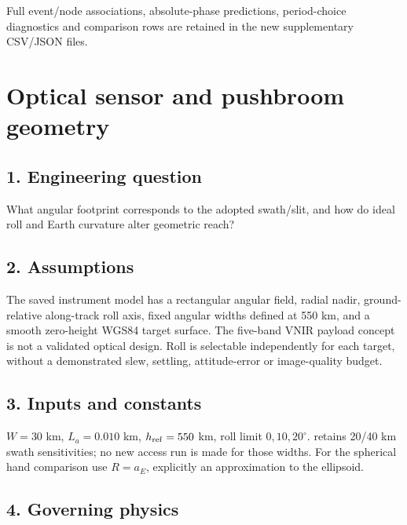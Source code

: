 \documentclass[10pt,a4paper]{article}
\numberwithin{equation}{section}
\begin{document}
\begin{sloppypar}Full event/node associations, absolute-phase predictions, period-choice diagnostics and comparison rows are retained in the new supplementary CSV/JSON files.\end{sloppypar}




\clearpage\section{Optical sensor and pushbroom geometry}\label{ch:6}

\subsection*{1. Engineering question}
\begin{sloppypar}What angular footprint corresponds to the adopted swath/slit, and how do ideal roll and Earth curvature alter geometric reach?\end{sloppypar}


\subsection*{2. Assumptions}
\begin{sloppypar}The saved instrument model has a rectangular angular field, radial nadir, ground-relative along-track roll axis, fixed angular widths defined at 550 km, and a smooth zero-height WGS84 target surface. The five-band VNIR payload concept is not a validated optical design. Roll is selectable independently for each target, without a demonstrated slew, settling, attitude-error or image-quality budget.\end{sloppypar}


\subsection*{3. Inputs and constants}
\begin{sloppypar}\(W=30\) km, \(L_a=0.010\) km, \(h_{\rm ref}=550\) km, roll limit \(0,10,20^\circ\). \cite{S06} retains 20/40 km swath sensitivities; no new access run is made for those widths. For the spherical hand comparison use \(R=a_E\), explicitly an approximation to the ellipsoid.\end{sloppypar}


\subsection*{4. Governing physics}
\end{document}
